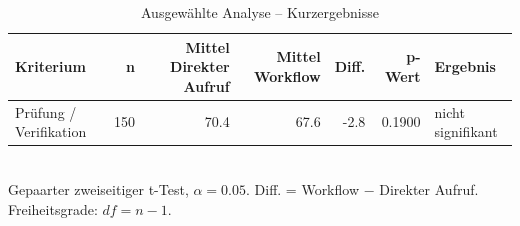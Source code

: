 \begin{table}[htbp]
\centering
\caption{Ausgewählte Analyse -- Kurzergebnisse}
\begin{tabular}{lrrrrrl}
\toprule
Kriterium & n & Mittel Direkter Aufruf & Mittel Workflow & Diff. & p-Wert & Ergebnis \\
\midrule
Prüfung / Verifikation & 150 & 70.4 & 67.6 & -2.8 & 0.1900 & nicht signifikant \\
\bottomrule
\end{tabular}
\\[2mm]
\footnotesize Gepaarter zweiseitiger t-Test, $\alpha=0.05$. Diff. = Workflow $-$ Direkter Aufruf. Freiheitsgrade: $df=n-1$.
\end{table}
